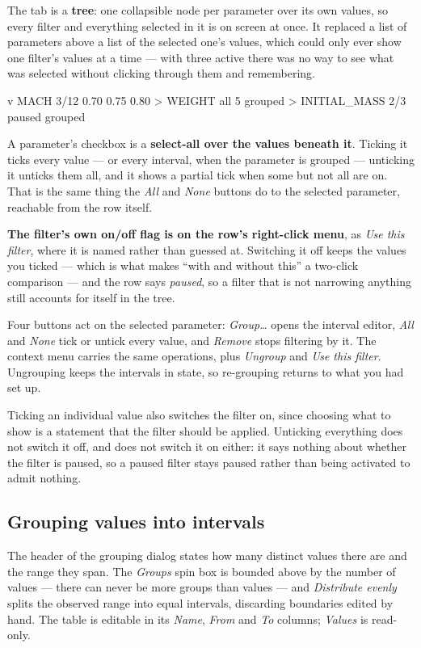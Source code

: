 \documentclass[11pt,a4paper,oneside]{report}
\begin{document}
The tab is a \textbf{tree}: one collapsible node per parameter over its own
values, so every filter and everything selected in it is on screen at once. It
replaced a list of parameters above a list of the selected one's values, which
could only ever show one filter's values at a time --- with three active there
was no way to see what was selected without clicking through them and
remembering.

\begin{aoecode}
 v MACH      3/12
     0.70
     0.75
     0.80
 > WEIGHT    all 5   grouped
 > INITIAL_MASS   2/3   paused   grouped
\end{aoecode}

A parameter's checkbox is a \textbf{select-all over the values beneath it}.
Ticking it ticks every value --- or every interval, when the parameter is
grouped --- unticking it unticks them all, and it shows a partial tick when some
but not all are on. That is the same thing the \emph{All} and \emph{None}
buttons do to the selected parameter, reachable from the row itself.

\textbf{The filter's own on/off flag is on the row's right-click menu}, as
\emph{Use this filter}, where it is named rather than guessed at. Switching it
off keeps the values you ticked --- which is what makes ``with and without
this'' a two-click comparison --- and the row says \emph{paused}, so a filter
that is not narrowing anything still accounts for itself in the tree.

Four buttons act on the selected parameter: \emph{Group\ldots} opens the interval
editor, \emph{All} and \emph{None} tick or untick every value, and \emph{Remove}
stops filtering by it. The context menu carries the same operations, plus
\emph{Ungroup} and \emph{Use this filter}. Ungrouping keeps the intervals in
state, so re-grouping returns to what you had set up.

Ticking an individual value also switches the filter on, since choosing what to
show is a statement that the filter should be applied. Unticking everything does
not switch it off, and does not switch it on either: it says nothing about
whether the filter is paused, so a paused filter stays paused rather than being
activated to admit nothing.

\subsection{Grouping values into intervals}

The header of the grouping dialog states how many distinct values there are and
the range they span. The \emph{Groups} spin box is bounded above by the number of
values --- there can never be more groups than values --- and \emph{Distribute
evenly} splits the observed range into equal intervals, discarding boundaries
edited by hand. The table is editable in its \emph{Name}, \emph{From} and
\emph{To} columns; \emph{Values} is read-only.
\end{document}
